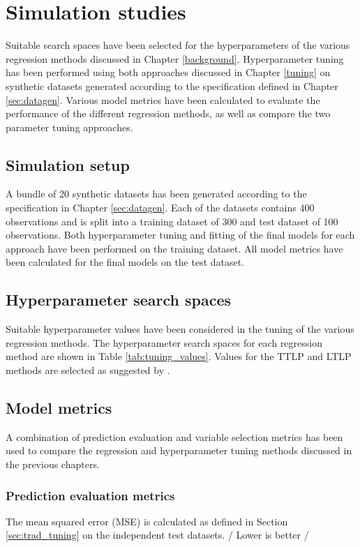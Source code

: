 \chapter{Simulation studies}
Suitable search spaces have been selected for the hyperparameters of the various regression methods discussed in Chapter \ref{background}. Hyperparameter tuning has been performed using both approaches discussed in Chapter \ref{tuning} on synthetic datasets generated according to the specification defined in Chapter \ref{sec:datagen}. Various model metrics have been calculated to evaluate the performance of the different regression methods, as well as compare the two parameter tuning approaches.


\section{Simulation setup}
A bundle of 20 synthetic datasets has been generated according to the specification in Chapter \ref{sec:datagen}. Each of the datasets contains 400 observations and is split into a training dataset of 300 and test dataset of 100 observations. Both hyperparameter tuning and fitting of the final models for each approach have been performed on the training dataset. All model metrics have been calculated for the final models on the test dataset.


\section{Hyperparameter search spaces}
Suitable hyperparameter values have been considered in the tuning of the various regression methods. The hyperparameter search spaces for each regression method are shown in Table \ref{tab:tuning_values}. Values for the TTLP and LTLP methods are selected as suggested by \cite{kim2013network}.



\section{Model metrics}
A combination of prediction evaluation and variable selection metrics has been used to compare the regression and hyperparameter tuning methods discussed in the previous chapters.

\subsection{Prediction evaluation metrics}
The mean squared error (MSE) is calculated as defined in Section \ref{sec:trad_tuning} on the independent test datasets. / Lower is better /

